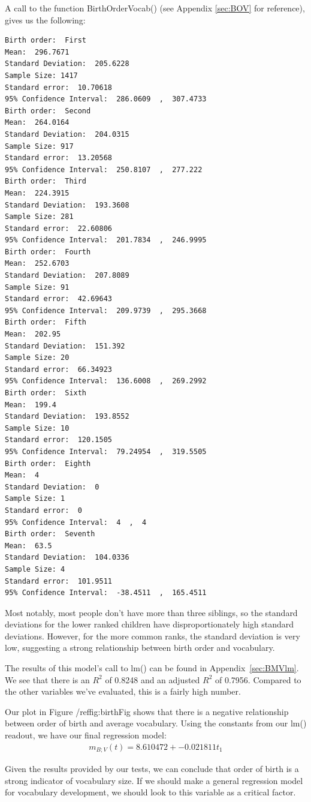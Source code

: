 \documentclass[11pt]{article}  %
\begin{document}
\indent A call to the function BirthOrderVocab() (see Appendix \ref{sec:BOV} for reference), gives us the following:
\begin{lstlisting}
Birth order:  First 
Mean:  296.7671 
Standard Deviation:  205.6228 
Sample Size: 1417 
Standard error:  10.70618 
95% Confidence Interval:  286.0609  ,  307.4733 
Birth order:  Second 
Mean:  264.0164 
Standard Deviation:  204.0315 
Sample Size: 917 
Standard error:  13.20568 
95% Confidence Interval:  250.8107  ,  277.222 
Birth order:  Third 
Mean:  224.3915 
Standard Deviation:  193.3608 
Sample Size: 281 
Standard error:  22.60806 
95% Confidence Interval:  201.7834  ,  246.9995 
Birth order:  Fourth 
Mean:  252.6703 
Standard Deviation:  207.8089 
Sample Size: 91 
Standard error:  42.69643 
95% Confidence Interval:  209.9739  ,  295.3668 
Birth order:  Fifth 
Mean:  202.95 
Standard Deviation:  151.392 
Sample Size: 20 
Standard error:  66.34923 
95% Confidence Interval:  136.6008  ,  269.2992 
Birth order:  Sixth 
Mean:  199.4 
Standard Deviation:  193.8552 
Sample Size: 10 
Standard error:  120.1505 
95% Confidence Interval:  79.24954  ,  319.5505 
Birth order:  Eighth 
Mean:  4 
Standard Deviation:  0 
Sample Size: 1 
Standard error:  0 
95% Confidence Interval:  4  ,  4 
Birth order:  Seventh 
Mean:  63.5 
Standard Deviation:  104.0336 
Sample Size: 4 
Standard error:  101.9511 
95% Confidence Interval:  -38.4511  ,  165.4511 
\end{lstlisting}
\indent Most notably, most people don't have more than three siblings, so the standard deviations for the lower ranked children have disproportionately high standard deviations. However, for the more common ranks, the standard deviation is very low, suggesting a strong relationship between birth order and vocabulary.

\indent The results of this model's call to lm() can be found in Appendix~\ref{sec:BMVlm}. We see that there is an $R^2$ of 0.8248 and an adjusted $R^2$ of 0.7956. Compared to the other variables we've evaluated, this is a fairly high number.

\indent Our plot in Figure /ref{fig:birthFig} shows that there is a negative relationship between order of birth and average vocabulary. Using the constants from our lm() readout, we have our final regression model:
    \begin{align*}
        m_{B;V}(t) = 8.610472 + -0.021811 t_1
    \end{align*}
    
\indent Given the results provided by our tests, we can conclude that order of birth is a strong indicator of vocabulary size. If we should make a general regression model for vocabulary development, we should look to this variable as a critical factor.
\end{document}
